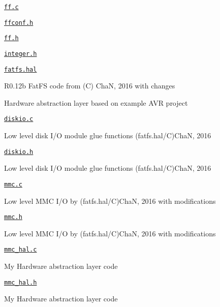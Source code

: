 \begin{DoxyItemize}
\begin{DoxyItemize}
\item \href{fatfs/ff.c}{\tt ff.\+c}
\item \href{fatfs/ffconf.h}{\tt ffconf.\+h}
\item \href{fatfs/ff.h}{\tt ff.\+h}
\item \href{fatfs/integer.h}{\tt integer.\+h}
\end{DoxyItemize}
\item \href{fatfs.hal/fatfs.hal}{\tt fatfs.\+hal}
\begin{DoxyItemize}
\item R0.\+12b Fat\+FS code from (C) ChaN, 2016 with changes
\item Hardware abstraction layer based on example A\+VR project
\item \href{fatfs.hal/diskio.c}{\tt diskio.\+c}
\begin{DoxyItemize}
\item Low level disk I/O module glue functions (fatfs.\+hal/C)ChaN, 2016
\end{DoxyItemize}
\item \href{fatfs.hal/diskio.h}{\tt diskio.\+h}
\begin{DoxyItemize}
\item Low level disk I/O module glue functions (fatfs.\+hal/C)ChaN, 2016
\end{DoxyItemize}
\item \href{fatfs.hal/mmc.c}{\tt mmc.\+c}
\begin{DoxyItemize}
\item Low level M\+MC I/O by (fatfs.\+hal/C)ChaN, 2016 with modifications
\end{DoxyItemize}
\item \href{fatfs.hal/mmc.h}{\tt mmc.\+h}
\begin{DoxyItemize}
\item Low level M\+MC I/O by (fatfs.\+hal/C)ChaN, 2016 with modifications
\end{DoxyItemize}
\item \href{fatfs.hal/mmc_hal.c}{\tt mmc\+\_\+hal.\+c}
\begin{DoxyItemize}
\item My Hardware abstraction layer code
\end{DoxyItemize}
\item \href{fatfs.hal/mmc_hal.h}{\tt mmc\+\_\+hal.\+h}
\begin{DoxyItemize}
\item My Hardware abstraction layer code
\end{DoxyItemize}
\end{DoxyItemize}

\end{DoxyItemize}
